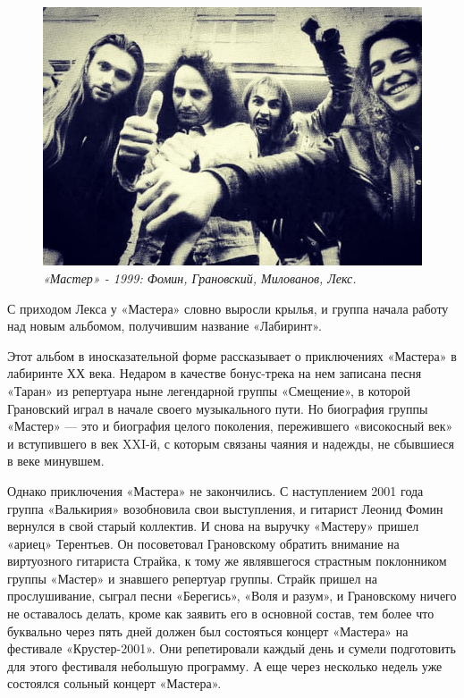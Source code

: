 \documentclass[16pt,a5paper,oneside]{book}
\begin{document}
\begin{figure}
    \centering
    \includegraphics[scale=0.6]{Image33}
    \caption{\textit{«Мастер» - 1999: Фомин, Грановский, Милованов, Лекс.}}
\end{figure}

С приходом Лекса у «Мастера» словно выросли крылья, и группа начала работу над новым альбомом, получившим название
«Лабиринт».

Этот альбом в иносказательной форме рассказывает о приключениях «Мастера» в лабиринте ХХ века. Недаром в качестве
бонус-трека на нем записана песня «Таран» из репертуара ныне легендарной группы «Смещение», в которой Грановский играл в
начале своего музыкального пути. Но биография группы «Мастер» — это и биография целого поколения, пережившего
«високосный век» и вступившего в век XXI-й, с которым связаны чаяния и надежды, не сбывшиеся в веке минувшем.

Однако приключения «Мастера» не закончились. С наступлением 2001 года группа «Валькирия» возобновила свои выступления, и
гитарист Леонид Фомин вернулся в свой старый коллектив. И снова на выручку «Мастеру» пришел «ариец» Терентьев. Он
посоветовал Грановскому обратить внимание на виртуозного гитариста Страйка, к тому же являвшегося страстным поклонником
группы «Мастер» и знавшего репертуар группы. Страйк пришел на прослушивание, сыграл песни «Берегись», «Воля и разум», и
Грановскому ничего не оставалось делать, кроме как заявить его в основной состав, тем более что буквально через пять
дней должен был состояться концерт «Мастера» на фестивале «Крустер-2001». Они репетировали каждый день и сумели
подготовить для этого фестиваля небольшую программу. А еще через несколько недель уже состоялся сольный концерт
«Мастера».
\end{document}
